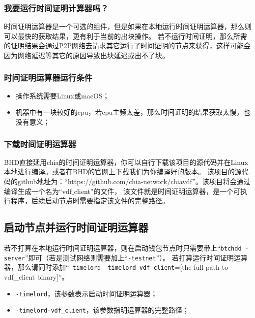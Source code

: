\subsubsection{我要运行时间证明计算器吗？}
\begin{flushleft}
    时间证明运算器是一个可选的组件，但是如果在本地运行时间证明运算器，那么则可以最快的获取结果，更有利于当前的出块操作。
    若不运行时间证明，那么所需的证明结果会通过P2P网络去请求其它运行了时间证明的节点来获得，这样可能会因为网络延迟等其它的原因导致出块延迟或出不了块。
\end{flushleft}
\subsubsection{时间证明运算器运行条件}
\begin{itemize}
    \item 操作系统需要Linux或macOS；
    \item 机器中有一块较好的cpu，若cpu主频太差，那么时间证明的结果获取太慢，也没有意义；
\end{itemize}
\subsubsection{下载时间证明运算器}
\begin{flushleft}
    BHD直接延用chia的时间证明运算器，你可以自行下载该项目的源代码并在Linux本地进行编译。或者在BHD的官网上下载我们为你编译好的版本。
    该项目的源代码的github地址为：``https://github.com/chia-network/chiavdf''。该项目将会通过编译生成一个名为``vdf$\_$client''的文件，
    该文件就是时间证明运算器，是一个可执行程序，后续启动节点时需要指定该文件的完整路径。
\end{flushleft}
\subsection{启动节点并运行时间证明运算器}
\begin{flushleft}
    若不打算在本地运行时间证明运算器，则在启动钱包节点时只需要带上``\texttt{btchdd -server}''即可（若是测试网络则需要加上``\texttt{-testnet}''）。
    若打算运行时间证明运算器，那么请同时添加``\texttt{-timelord -timelord-vdf_client}=[the full path to vdf\_client binary]''。
\end{flushleft}
\begin{itemize}
    \item \texttt{-timelord}，该参数表示启动时间证明运算器；
    \item \texttt{-timelord-vdf_client}，该参数指明运算器的完整路径；
\end{itemize}
